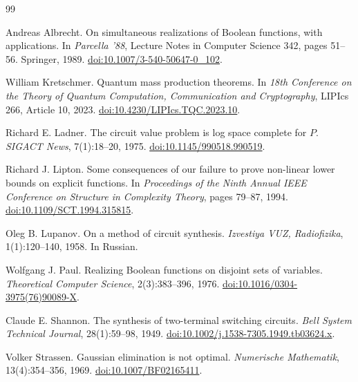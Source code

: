 \documentclass[11pt]{article}
\theoremstyle{definition}
\begin{document}
\begin{thebibliography}{99}

Andreas Albrecht.
\newblock On simultaneous realizations of Boolean functions, with applications.
\newblock In \emph{Parcella '88}, Lecture Notes in Computer Science 342,
pages 51--56. Springer, 1989.
\newblock \href{https://doi.org/10.1007/3-540-50647-0_102}{doi:10.1007/3-540-50647-0\_102}.

William Kretschmer.
\newblock Quantum mass production theorems.
\newblock In \emph{18th Conference on the Theory of Quantum Computation,
Communication and Cryptography}, LIPIcs 266, Article 10, 2023.
\newblock \href{https://doi.org/10.4230/LIPIcs.TQC.2023.10}{doi:10.4230/LIPIcs.TQC.2023.10}.

Richard E. Ladner.
\newblock The circuit value problem is log space complete for $P$.
\newblock \emph{SIGACT News}, 7(1):18--20, 1975.
\newblock \href{https://doi.org/10.1145/990518.990519}{doi:10.1145/990518.990519}.

Richard J. Lipton.
\newblock Some consequences of our failure to prove non-linear lower bounds
on explicit functions.
\newblock In \emph{Proceedings of the Ninth Annual IEEE Conference on
Structure in Complexity Theory}, pages 79--87, 1994.
\newblock \href{https://doi.org/10.1109/SCT.1994.315815}{doi:10.1109/SCT.1994.315815}.

Oleg B. Lupanov.
\newblock On a method of circuit synthesis.
\newblock \emph{Izvestiya VUZ, Radiofizika}, 1(1):120--140, 1958.
\newblock In Russian.

Wolfgang J. Paul.
\newblock Realizing Boolean functions on disjoint sets of variables.
\newblock \emph{Theoretical Computer Science}, 2(3):383--396, 1976.
\newblock \href{https://doi.org/10.1016/0304-3975(76)90089-X}{doi:10.1016/0304-3975(76)90089-X}.

Claude E. Shannon.
\newblock The synthesis of two-terminal switching circuits.
\newblock \emph{Bell System Technical Journal}, 28(1):59--98, 1949.
\newblock \href{https://doi.org/10.1002/j.1538-7305.1949.tb03624.x}{doi:10.1002/j.1538-7305.1949.tb03624.x}.

Volker Strassen.
\newblock Gaussian elimination is not optimal.
\newblock \emph{Numerische Mathematik}, 13(4):354--356, 1969.
\newblock \href{https://doi.org/10.1007/BF02165411}{doi:10.1007/BF02165411}.


\end{thebibliography}
\end{document}
